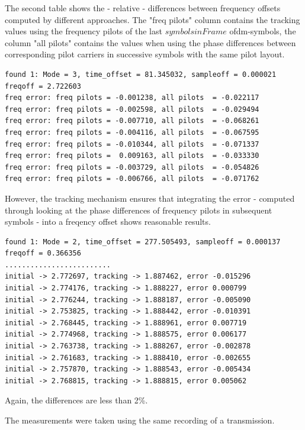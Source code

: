 \documentclass[11pt]{article}
\begin{document}
The second table shows the - relative - differences between
frequency offsets computed by different approaches.
The "freq pilots" column contains the tracking values using the frequency pilots
of the last $symbolsinFrame$ ofdm-symbols, the column "all pilots" contains
the values when using the phase differences between corresponding
pilot carriers in successive symbols with the same pilot layout.
{\small
\begin{verbatim}
found 1: Mode = 3, time_offset = 81.345032, sampleoff = 0.000021 freqoff = 2.722603
freq error: freq pilots = -0.001238, all pilots  = -0.022117
freq error: freq pilots = -0.002598, all pilots  = -0.029494
freq error: freq pilots = -0.007710, all pilots  = -0.068261
freq error: freq pilots = -0.004116, all pilots  = -0.067595
freq error: freq pilots = -0.010344, all pilots  = -0.071337
freq error: freq pilots =  0.009163, all pilots  = -0.033330
freq error: freq pilots = -0.003729, all pilots  = -0.054826
freq error: freq pilots = -0.006766, all pilots  = -0.071762
\end{verbatim}
}
However, the tracking mechanism ensures that integrating the error
- computed through looking at the phase differences of frequency pilots
in subsequent symbols -
into a freqency offset shows reasonable results.
{\small
\begin{verbatim}
found 1: Mode = 2, time_offset = 277.505493, sampleoff = 0.000137 freqoff = 0.366356
.........................
initial -> 2.772697, tracking -> 1.887462, error -0.015296
initial -> 2.774176, tracking -> 1.888227, error 0.000799
initial -> 2.776244, tracking -> 1.888187, error -0.005090
initial -> 2.753825, tracking -> 1.888442, error -0.010391
initial -> 2.768445, tracking -> 1.888961, error 0.007719
initial -> 2.774968, tracking -> 1.888575, error 0.006177
initial -> 2.763738, tracking -> 1.888267, error -0.002878
initial -> 2.761683, tracking -> 1.888410, error -0.002655
initial -> 2.757870, tracking -> 1.888543, error -0.005434
initial -> 2.768815, tracking -> 1.888815, error 0.005062
\end{verbatim}
}
Again, the differences are less than 2\%.

The measurements were taken using the same recording of a transmission.
\end{document}
